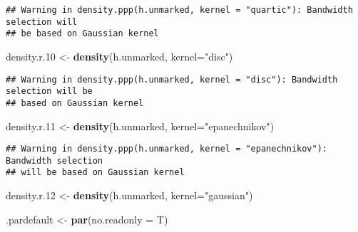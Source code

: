 \documentclass[]{article}
\newenvironment{Shaded}{\begin{snugshade}}{\end{snugshade}}
\newcommand{\DataTypeTok}[1]{\textcolor[rgb]{0.13,0.29,0.53}{#1}}
\newcommand{\FloatTok}[1]{\textcolor[rgb]{0.00,0.00,0.81}{#1}}
\newcommand{\KeywordTok}[1]{\textcolor[rgb]{0.13,0.29,0.53}{\textbf{#1}}}
\newcommand{\NormalTok}[1]{#1}
\newcommand{\StringTok}[1]{\textcolor[rgb]{0.31,0.60,0.02}{#1}}
\begin{document}
\begin{verbatim}
## Warning in density.ppp(h.unmarked, kernel = "quartic"): Bandwidth selection will
## be based on Gaussian kernel
\end{verbatim}

\begin{Shaded}
\begin{Highlighting}[]
\NormalTok{density.r}\FloatTok{.10}\NormalTok{ <-}\StringTok{ }\KeywordTok{density}\NormalTok{(h.unmarked, }\DataTypeTok{kernel=}\StringTok{"disc"}\NormalTok{)}
\end{Highlighting}
\end{Shaded}

\begin{verbatim}
## Warning in density.ppp(h.unmarked, kernel = "disc"): Bandwidth selection will be
## based on Gaussian kernel
\end{verbatim}

\begin{Shaded}
\begin{Highlighting}[]
\NormalTok{density.r}\FloatTok{.11}\NormalTok{ <-}\StringTok{ }\KeywordTok{density}\NormalTok{(h.unmarked, }\DataTypeTok{kernel=}\StringTok{"epanechnikov"}\NormalTok{)}
\end{Highlighting}
\end{Shaded}

\begin{verbatim}
## Warning in density.ppp(h.unmarked, kernel = "epanechnikov"): Bandwidth selection
## will be based on Gaussian kernel
\end{verbatim}

\begin{Shaded}
\begin{Highlighting}[]
\NormalTok{density.r}\FloatTok{.12}\NormalTok{ <-}\StringTok{ }\KeywordTok{density}\NormalTok{(h.unmarked, }\DataTypeTok{kernel=}\StringTok{"gaussian"}\NormalTok{)}
\end{Highlighting}
\end{Shaded}

\begin{Shaded}
\begin{Highlighting}[]
\NormalTok{.pardefault <-}\StringTok{ }\KeywordTok{par}\NormalTok{(}\DataTypeTok{no.readonly =}\NormalTok{ T)}
\end{Highlighting}
\end{Shaded}
\end{document}
